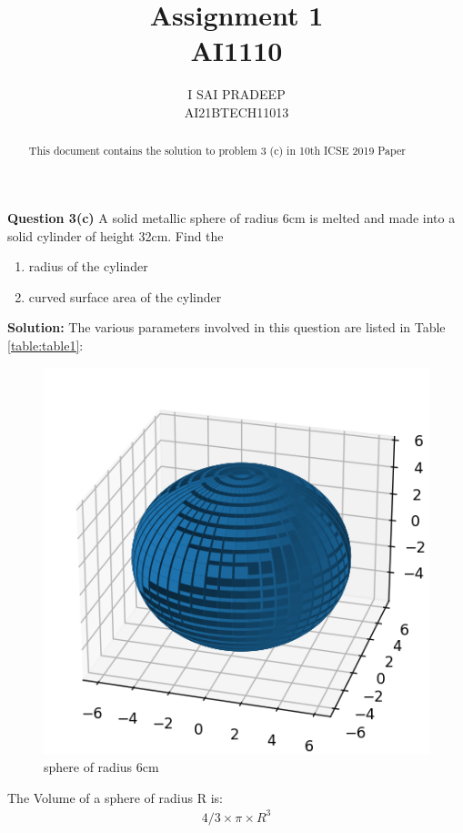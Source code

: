 \documentclass[journal,12pt,twocolumn]{IEEEtran}
\begin{document}
	\title{\huge{Assignment 1}\\AI1110}
	\author{\Large{I SAI PRADEEP}\\AI21BTECH11013}
	\maketitle
	\begin{abstract}
		This document contains the solution to problem 3 (c) in 10th ICSE 2019 Paper
	\end{abstract}
	
	\noindent \textbf{Question 3(c)} A solid metallic sphere of radius 6cm is melted and made into a solid cylinder of height 32cm. Find the
	\begin{enumerate}[label=(\roman*)]
		\item radius of the cylinder
		\item curved surface area of the cylinder
	\end{enumerate}	

	\textbf{Solution:} The various parameters involved in this question are listed in Table \eqref{table:table1}:
	\begin{table}[!ht]
		
		\caption{}
		\label{table:table1}	
	\end{table}

\begin{figure}[h!]
	\centering
	\includegraphics[width=0.5\columnwidth]{figs/fig_sphere.png}
	\caption{sphere of radius 6cm}
	\label{sphere}
\end{figure}

	The Volume of a sphere of radius R is:
	\begin{align} 
		4/3 \times \pi \times R^3
	\end{align}
	
\end{document}
